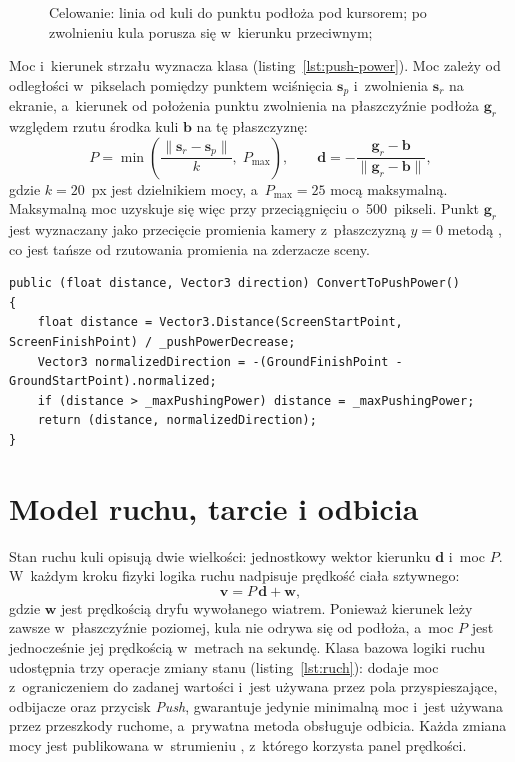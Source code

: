 \begin{figure}[!htb]
  \centering
  \caption{Celowanie: linia od kuli do punktu podłoża pod kursorem; po zwolnieniu kula
    porusza się w~kierunku przeciwnym; \zrodloWlasne}
  \label{rys:celowanie}
\end{figure}

Moc i~kierunek strzału wyznacza klasa 
(listing~\ref{lst:push-power}). Moc zależy od odległości w~pikselach pomiędzy punktem
wciśnięcia $\mathbf{s}_p$ i~zwolnienia $\mathbf{s}_r$ na ekranie, a~kierunek od położenia
punktu zwolnienia na płaszczyźnie podłoża $\mathbf{g}_r$ względem rzutu środka kuli
$\mathbf{b}$ na tę płaszczyznę:
\begin{equation}
  P = \min\left(\frac{\lVert \mathbf{s}_r - \mathbf{s}_p \rVert}{k},\; P_{\max}\right), \qquad
  \mathbf{d} = -\frac{\mathbf{g}_r - \mathbf{b}}{\lVert \mathbf{g}_r - \mathbf{b} \rVert},
  \label{eq:strzal}
\end{equation}
gdzie $k = 20$~px jest dzielnikiem mocy, a~$P_{\max} = 25$ mocą maksymalną. Maksymalną
moc uzyskuje się więc przy przeciągnięciu o~500~pikseli. Punkt $\mathbf{g}_r$ jest
wyznaczany jako przecięcie promienia kamery z~płaszczyzną $y = 0$ metodą
, co jest tańsze od rzutowania promienia na zderzacze sceny.

\begin{lstlisting}[caption={Wyznaczanie mocy i~kierunku strzału; \zrodloWlasne},label=lst:push-power]
public (float distance, Vector3 direction) ConvertToPushPower()
{
    float distance = Vector3.Distance(ScreenStartPoint, ScreenFinishPoint) / _pushPowerDecrease;
    Vector3 normalizedDirection = -(GroundFinishPoint - GroundStartPoint).normalized;
    if (distance > _maxPushingPower) distance = _maxPushingPower;
    return (distance, normalizedDirection);
}
\end{lstlisting}

\section{Model ruchu, tarcie i odbicia}

Stan ruchu kuli opisują dwie wielkości: jednostkowy wektor kierunku $\mathbf{d}$
i~moc $P$. W~każdym kroku fizyki logika ruchu nadpisuje prędkość ciała sztywnego:
\begin{equation}
  \mathbf{v} = P\,\mathbf{d} + \mathbf{w},
  \label{eq:predkosc}
\end{equation}
gdzie $\mathbf{w}$ jest prędkością dryfu wywołanego wiatrem. Ponieważ kierunek leży
zawsze w~płaszczyźnie poziomej, kula nie odrywa się od podłoża, a~moc $P$ jest
jednocześnie jej prędkością w~metrach na sekundę. Klasa bazowa logiki ruchu udostępnia
trzy operacje zmiany stanu (listing~\ref{lst:ruch}):  dodaje moc z~ograniczeniem
do zadanej wartości i~jest używana przez pola przyspieszające, odbijacze oraz przycisk
\emph{Push},  gwarantuje jedynie minimalną moc i~jest używana przez przeszkody
ruchome, a~prywatna metoda  obsługuje odbicia. Każda zmiana mocy jest
publikowana w~strumieniu , z~którego korzysta panel prędkości.

